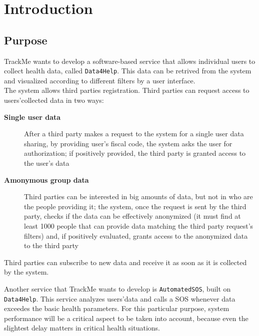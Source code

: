 \documentclass[../DD0.tex]{subfiles}
\begin{document}
\section{Introduction}
\label{sec:intro}

  \subsection{Purpose}
  \label{sec:purpose}

    TrackMe wants to develop a software-based service that allows individual users to collect health data, called \texttt{Data4Help}. This data can be retrived from the system and visualized according to different filters by a user interface. \\
    The system allows third parties registration. Third parties can request access to users'collected data in two ways:

    \begin{description}
      \item [\textbf{Single user data}] After a third party makes a request to the system for a single user data sharing, by providing  user's fiscal code, the system asks the user for authorization; if positively provided, the third party is granted access to the user's data

      \item [\textbf{Amonymous group data}] Third parties can be interested in big amounts of data, but not in who are the people providing it; the system, once the request is sent by the third party, checks if the data can be effectively anonymized (it must find at least 1000 people that can provide data matching the third party request's filters) and, if positively evaluated, grants access to the anonymized data to the third party
    \end{description}

    Third parties can subscribe to new data and receive it as soon as it is collected by the system.

    Another service that TrackMe wants to develop is \texttt{AutomatedSOS}, built on \texttt{Data4Help}. This service analyzes users'data and calls a SOS whenever data exceedes the basic health parameters. For this particular purpose, system performance will be a critical aspect to be taken into account, because even the slightest delay matters in critical health situations.
\end{document}

